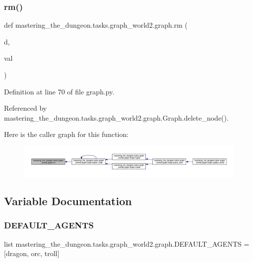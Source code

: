 \subsubsection{\texorpdfstring{rm()}{rm()}}
{\footnotesize\ttfamily def mastering\+\_\+the\+\_\+dungeon.\+tasks.\+graph\+\_\+world2.\+graph.\+rm (\begin{DoxyParamCaption}\item[{}]{d,  }\item[{}]{val }\end{DoxyParamCaption})}



Definition at line 70 of file graph.\+py.



Referenced by mastering\+\_\+the\+\_\+dungeon.\+tasks.\+graph\+\_\+world2.\+graph.\+Graph.\+delete\+\_\+node().

Here is the caller graph for this function\+:
\nopagebreak
\begin{figure}[H]
\begin{center}
\leavevmode
\includegraphics[width=350pt]{namespacemastering__the__dungeon_1_1tasks_1_1graph__world2_1_1graph_a87e8d1d45f16bc53d3e994900560c716_icgraph}
\end{center}
\end{figure}


\subsection{Variable Documentation}
\mbox{\label{namespacemastering__the__dungeon_1_1tasks_1_1graph__world2_1_1graph_a4ce021e5ebf31913eb0b2815c040ba94}} 
\subsubsection{\texorpdfstring{D\+E\+F\+A\+U\+L\+T\+\_\+\+A\+G\+E\+N\+TS}{DEFAULT\_AGENTS}}
{\footnotesize\ttfamily list mastering\+\_\+the\+\_\+dungeon.\+tasks.\+graph\+\_\+world2.\+graph.\+D\+E\+F\+A\+U\+L\+T\+\_\+\+A\+G\+E\+N\+TS = \mbox{[}\textquotesingle{}dragon\textquotesingle{}, \textquotesingle{}orc\textquotesingle{}, \textquotesingle{}troll\textquotesingle{}\mbox{]}}



